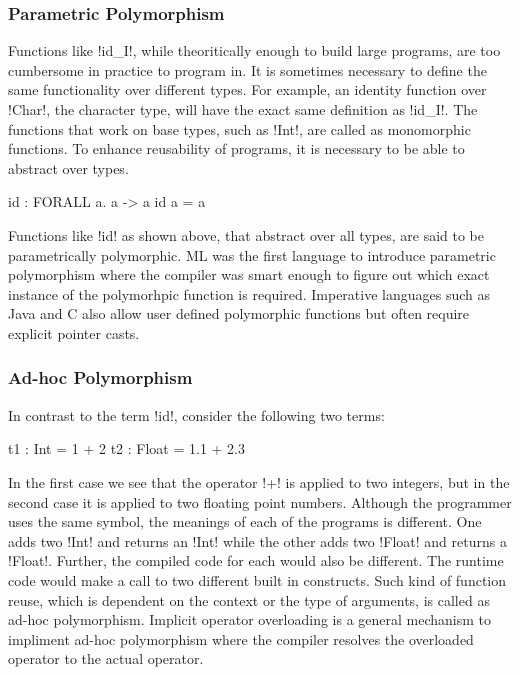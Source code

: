 \documentclass[manuscript,screen,nonacm]{acmart}
\begin{document}
\subsubsection{Parametric Polymorphism}
Functions like !id_I!, while theoritically enough to build large programs, are too cumbersome in practice to program in. It is sometimes necessary to define the same functionality over different types. For example, an identity function over !Char!, the character type, will have the exact same definition as !id_I!. The functions that work on base types, such as !Int!, are called as monomorphic functions. To enhance reusability of programs, it is necessary to be able to abstract over types.

\begin{CenteredBox}
\begin{code}
id : FORALL a. a -> a
id a = a
\end{code}
\end{CenteredBox}
Functions like !id! as shown above, that abstract over all types, are said to be parametrically polymorphic\cite{strachey_fundamental_2000}. ML\cite{milner_logic_1975, milner_theory_1978} was the first language to introduce parametric polymorphism where the compiler was smart enough to figure out which exact instance of the polymorhpic function is required. Imperative languages such as Java and C also allow user defined polymorphic functions but often require explicit pointer casts.

\subsubsection{Ad-hoc Polymorphism}
In contrast to the term !id!, consider the following two terms:

\begin{CenteredBox}
\begin{code}
t1 : Int = 1 + 2
t2 : Float = 1.1 + 2.3
\end{code}
\end{CenteredBox}
In the first case we see that the operator !+! is applied to two integers, but in the second case it is applied to two floating point numbers. Although the programmer uses the same symbol, the meanings of each of the programs is different. One adds two !Int! and returns an !Int! while the other adds two !Float! and returns a !Float!. Further, the compiled code for each would also be different. The runtime code would make a call to two different built in constructs. Such kind of function reuse, which is dependent on the context or the type of arguments, is called as ad-hoc polymorphism\cite{strachey_fundamental_2000}. Implicit operator overloading is a general mechanism to impliment ad-hoc polymorphism where the compiler resolves the overloaded operator to the actual operator.
\end{document}
